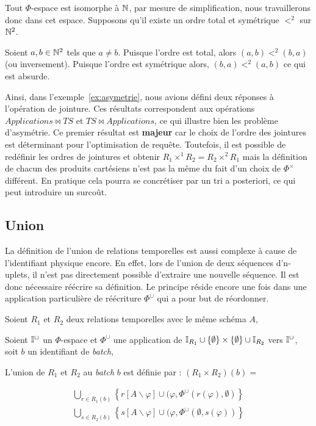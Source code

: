 \begin{demo}
    Tout $\Phi$-espace est isomorphe à $\mathbb{N}$, par mesure de simplification, nous travaillerons donc dans cet espace. Supposons qu'il existe un ordre total et symétrique $<^2$ sur $\mathbb{N}^2$.

    Soient $a,b\in \mathbb{N}^2$ tels que $a \neq b$. Puisque l'ordre est total, alors $(a,b) <^2 (b,a)$ (ou inversement). Puisque l'ordre est symétrique alors, $(b,a) <^2 (a,b)$ ce qui est absurde.
\end{demo}

Ainsi, dans l'exemple~\ref{ex:asymetrie}, nous avions défini deux réponses à l'opération de jointure. Ces résultats correspondent aux opérations $Applications\Join TS$ et $TS \Join Applications$, ce qui illustre bien les problème d'asymétrie. Ce premier résultat est \textbf{majeur} car le choix de l'ordre des jointures est déterminant pour l'optimisation de requête. Toutefois, il est possible de redéfinir les ordres de jointures et obtenir $R_1 \times^1 R_2 = R_2 \times^2 R_1$ mais la définition de chacun des produits cartésiens n'est pas la même du fait d'un choix de $\Phi^\times$ différent. En pratique cela pourra se concrétiser par un tri a posteriori, ce qui peut introduire un surcoût.

\subsection{Union}
La définition de l'union de relations temporelles est aussi complexe à cause de l'identifiant physique encore. En effet, lors de l'union de deux séquences d'n-uplets, il n'est pas directement possible d'extraire une nouvelle séquence. Il est donc nécessaire réécrire sa définition. Le principe réside encore une fois dans une application particulière de réécriture $\Phi^\cup$ qui a pour but de réordonner.
\begin{defi}
    Soient $R_1$ et $R_2$ deux relations temporelles avec le même schéma $A$,

    Soient $\mathbb{I}^{\cup}$ un $\Phi$-espace et $\Phi^\cup$ une application de $\mathbb{I}_{R_1}\cup\{\emptyset\}\times\{\emptyset\}\cup\mathbb{I}_{R_2}$ vers $\mathbb{I}^\cup$, soit $b$ un identifiant de \textit{batch},

    L'union de $R_1$ et $R_2$ au \textit{batch} $b$ est définie par : $(R_1\times R_2)(b)=$ 

        $$\begin{array}{c}
            \bigcup_{\scriptstyle r \in R_1(b)} \left\{ r[A\backslash \varphi] \cup (\varphi, \Phi^\cup(r(\varphi),\emptyset) \right\} \\
            \bigcup_{\scriptstyle s \in R_2(b)} \left\{ s[A\backslash \varphi] \cup (\varphi, \Phi^\cup(\emptyset,s(\varphi)) \right\}
        \end{array}$$
\end{defi}

